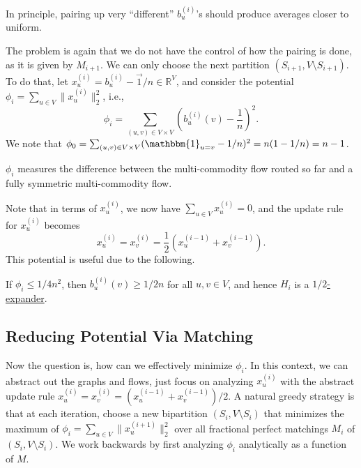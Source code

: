 \begin{intuition}
	In principle, pairing up very ``different'' \(b_u^{(i)}\)'s should produce averages closer to uniform.
\end{intuition}

The problem is again that we do not have the control of how the pairing is done, as it is given by \(M_{i+1}\). We can only choose the next partition \((S_{i+1}, V\setminus S_{i+1})\). To do that, let \(x_u^{(i)} = b_u^{(i)} - \vec{1} / n \in \mathbb{R} ^V\), and consider the potential \(\phi _i = \sum_{u \in V} \lVert x_u^{(i)} \rVert _2^2\), i.e.,
\[
	\phi _i
	= \sum_{(u, v) \in V \times V} \left( b_u^{(i)}(v) - \frac{1}{n} \right) ^2.
\]
We note that \(\phi _0 = \sum_{(u, v) \in V \times V} (\mathbbm{1}_{u = v} - 1 / n)^2 = n (1 - 1 / n) = n - 1\).

\begin{intuition}
	\(\phi _i\) measures the difference between the multi-commodity flow routed so far and a fully symmetric multi-commodity flow.
\end{intuition}

Note that in terms of \(x_u^{(i)}\), we now have \(\sum_{u \in V} x_u^{(i)} = 0\), and the update rule for \(x_u^{(i)}\) becomes
\[
	x_u^{(i)}
	= x_v^{(i)}
	= \frac{1}{2} (x_u^{(i-1)} + x_v^{(i-1)}).
\]
This potential is useful due to the following.

\begin{claim}\label{clm:cut-matching-goal}
	If \(\phi _i \leq 1 / 4n^2\), then \(b_u^{(i)}(v) \geq 1 / 2n\) for all \(u, v \in V\), and hence \(H_i\) is a \hyperref[def:expander]{\(1 / 2\)-expander}.
\end{claim}

\subsection{Reducing Potential Via Matching}
Now the question is, how can we effectively minimize \(\phi _i\). In this context, we can abstract out the graphs and flows, just focus on analyzing \(x_u^{(i)}\) with the abstract update rule \(x_u^{(i)} = x_v^{(i)} = (x_u^{(i-1)} + x_v^{(i-1)}) / 2\). A natural greedy strategy is that at each iteration, choose a new bipartition \((S_i , V\setminus S_i )\) that minimizes the maximum of \(\phi _i = \sum_{u \in V} \lVert x_u^{(i+1)} \rVert _2^2\) over all fractional perfect matchings \(M_i \) of \((S_i , V\setminus S_i )\). We work backwards by first analyzing \(\phi _i\) analytically as a function of \(M\).

